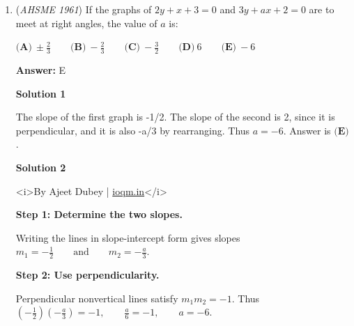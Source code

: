 \begin{enumerate}
Use dimensional analysis.
 \[\frac{a/6 \text{ feet}}{r \text{ seconds}} \cdot \frac{1 \text{ yard}}{3 \text{ feet}} \cdot \frac{60 \text{ seconds}}{1 \text{ minute}} \cdot 3 \text{ minutes}\]
 \[\frac{10a}{r} \text{ yards}\]The answer is $\boxed{\textbf{(E)}}$.

 



\textbf{Solution 2}

<i>By Ajeet Dubey | \href{https://ioqm.in}{ioqm.in}</i>

 \textbf{Step 1: Find the speed.}

 The car covers $a/6$ feet in $r$ seconds, so its speed is$\frac{a}{6r}\text{ feet per second}.$

 \textbf{Step 2: Convert the three-minute distance to yards.}

 Since three minutes is $180$ seconds, the distance is$\frac{a}{6r}\cdot180=\frac{30a}{r}\text{ feet}=\frac{10a}{r}\text{ yards}.$

 Thus the answer is $\boxed{\textbf{(E)}}$.

 


	\item (\textit{AHSME 1961}) If the graphs of $2y+x+3=0$ and $3y+ax+2=0$ are to meet at right angles, the value of $a$ is:


 $\textbf{(A)}\ \pm \frac{2}{3} \qquad \textbf{(B)}\ -\frac{2}{3}\qquad \textbf{(C)}\ -\frac{3}{2} \qquad \textbf{(D)}\ 6\qquad \textbf{(E)}\ -6$

 \textbf{Answer: }E



\textbf{Solution 1}

The slope of the first graph is -1/2. The slope of the second is 2, since it is perpendicular, and it is also -a/3 by rearranging. Thus $a=-6$.  Answer is $\boxed{\textbf{(E)}}$.

 



\textbf{Solution 2}

<i>By Ajeet Dubey | \href{https://ioqm.in}{ioqm.in}</i>

 \textbf{Step 1: Determine the two slopes.}

 Writing the lines in slope-intercept form gives slopes$m_1=-\frac12\qquad\text{and}\qquad m_2=-\frac a3.$

 \textbf{Step 2: Use perpendicularity.}

 Perpendicular nonvertical lines satisfy $m_1m_2=-1$. Thus$\left(-\frac12\right)\left(-\frac a3\right)=-1, \qquad \frac a6=-1, \qquad a=-6.$


\end{enumerate}
